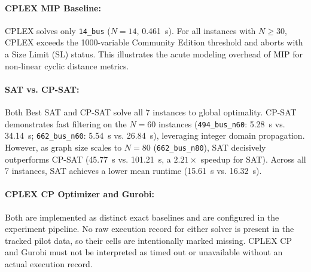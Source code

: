 \documentclass[a4paper,fleqn]{cas-sc}
\begin{document}
\paragraph{CPLEX MIP Baseline:} CPLEX solves only \texttt{14\_bus} ($N=14$, 0.461~s). For all instances with $N \ge 30$, CPLEX exceeds the 1000-variable Community Edition threshold and aborts with a Size Limit (SL) status. This illustrates the acute modeling overhead of MIP for non-linear cyclic distance metrics.

\paragraph{SAT vs. CP-SAT:} Both Best SAT and CP-SAT solve all 7 instances to global optimality. CP-SAT demonstrates fast filtering on the $N=60$ instances (\texttt{494\_bus\_n60}: 5.28~s vs. 34.14~s; \texttt{662\_bus\_n60}: 5.54~s vs. 26.84~s), leveraging integer domain propagation. However, as graph size scales to $N=80$ (\texttt{662\_bus\_n80}), SAT decisively outperforms CP-SAT (45.77~s vs. 101.21~s, a $2.21\times$ speedup for SAT). Across all 7 instances, SAT achieves a lower mean runtime (15.61~s vs. 16.32~s).

\paragraph{CPLEX CP Optimizer and Gurobi:} Both are implemented as distinct exact baselines and are configured in the experiment pipeline. No raw execution record for either solver is present in the tracked pilot data, so their cells are intentionally marked missing. CPLEX CP and Gurobi must not be interpreted as timed out or unavailable without an actual execution record.
\end{document}
